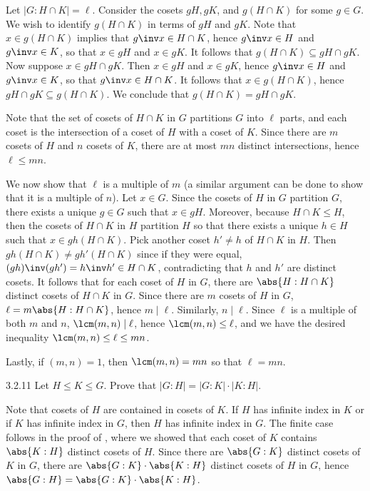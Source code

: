 \begin{sol}[spsol] 
    Let $|G : H \cap K| = \ell$.
	Consider the cosets $gH, gK$, and $g(H \cap K)$ for some $g \in G$.
	We wish to identify $g(H \cap K)$ in terms of $gH$ and $gK$.
	Note that $x \in g(H \cap K)$ implies that $g\inv x \in H \cap K$, hence $g\inv x \in H$ and $g\inv x \in K$, so that $x \in gH$ and $x \in gK$.
	It follows that $g(H \cap K) \subseteq gH \cap gK$.
	Now suppose $x \in gH \cap gK$.
	Then $x \in gH$ and $x \in gK$, hence $g\inv x \in H$ and $g\inv x \in K$, so that $g\inv x \in H \cap K$.
	It follows that $x \in g(H \cap K)$, hence $gH \cap gK \subseteq g(H \cap K)$.
	We conclude that $g(H \cap K) = gH \cap gK$.

    Note that the set of cosets of $H \cap K$ in $G$ partitions $G$ into $\ell$ parts, and each coset is the intersection of a coset of $H$ with a coset of $K$.
	Since there are $m$ cosets of $H$ and $n$ cosets of $K$, there are at most $mn$ distinct intersections, hence $\ell \leq mn$. 

    We now show that $\ell$ is a multiple of $m$ (a similar argument can be done to show that it is a multiple of $n$).
	Let $x \in G$.
	Since the cosets of $H$ in $G$ partition $G$, there exists a unique $g \in G$ such that $x \in gH$.
	Moreover, because $H \cap K \leq H$, then the cosets of $H \cap K$ in $H$ partition $H$ so that there exists a unique $h \in H$ such that $x \in gh(H \cap K)$.
	Pick another coset $h' \neq h$ of $H \cap K$ in $H$.
	Then $gh(H \cap K) \neq gh'(H \cap K)$ since if they were equal, $(gh)\inv(gh') = h\inv h' \in H \cap K$, contradicting that $h$ and $h'$ are distinct cosets.
	It follows that for each coset of $H$ in $G$, there are $\abs{H : H \cap K}$ distinct cosets of $H \cap K$ in $G$.
	Since there are $m$ cosets of $H$ in $G$, $\ell = m \abs{H : H \cap K}$, hence $m \mid \ell$.
	Similarly, $n \mid \ell$.
	Since $\ell$ is a multiple of both $m$ and $n$, $\lcm(m, n) \mid \ell$, hence $\lcm(m, n) \leq \ell$, and we have the desired inequality $\lcm(m, n) \leq \ell \leq mn$.

    Lastly, if $(m, n) = 1$, then $\lcm(m, n) = mn$ so that $\ell = mn$.
\end{sol}

\begin{spex}{3.2.11}
    Let $H \leq K \leq G$.
	Prove that $|G : H| = |G : K| \cdot |K : H|$. 
\end{spex}

\begin{sol}[spsol]
    Note that cosets of $H$ are contained in cosets of $K$.
	If $H$ has infinite index in $K$ or if $K$ has infinite index in $G$, then $H$ has infinite index in $G$.
	The finite case follows in the proof of , where we showed that each coset of $K$ contains $\abs{K : H}$ distinct cosets of $H$.
	Since there are $\abs{G : K}$ distinct cosets of $K$ in $G$, there are $\abs{G : K} \cdot \abs{K : H}$ distinct cosets of $H$ in $G$, hence $\abs{G : H} = \abs{G : K} \cdot \abs{K : H}$.
\end{sol}

